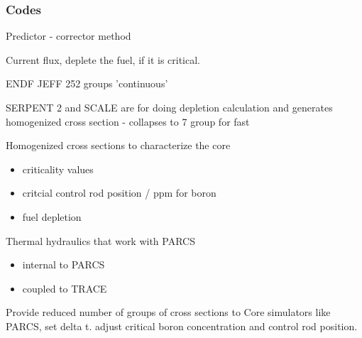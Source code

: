 \documentclass[9pt]{beamer}
\begin{document}
\begin{frame}
\frametitle{Codes}
Predictor - corrector method

Current flux, deplete the fuel, if it is critical.


ENDF JEFF 252 groups 'continuous'


SERPENT 2 and SCALE are for doing depletion calculation and
generates homogenized cross section -
collapses to 7 group for fast


Homogenized cross sections to characterize the core
\begin{itemize}
    \item criticality values
    \item critcial control rod position / ppm for boron
    \item fuel depletion
\end{itemize}

Thermal hydraulics that work with PARCS
\begin{itemize}
    \item internal to PARCS
    \item coupled to TRACE
\end{itemize}


Provide reduced number of groups of cross sections to
Core simulators like PARCS, set delta t. 
adjust critical boron concentration and control rod position.
\end{frame}
\end{document}
